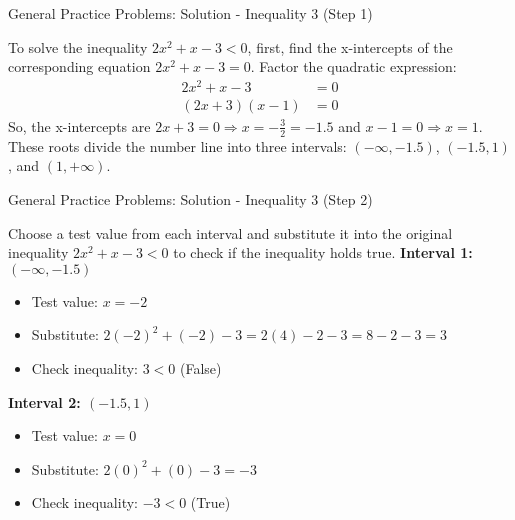 \documentclass[aspectratio=169]{beamer}
\begin{document}
\begin{frame}{General Practice Problems: Solution - Inequality 3 (Step 1)}
    \begin{tcolorbox}[colback=lightgray,colframe=accent,title=Solution: $2x^2 + x - 3 < 0$ (Step 1 - Find X-intercepts)]
        \footnotesize
        To solve the inequality $2x^2 + x - 3 < 0$, first, find the x-intercepts of the corresponding equation $2x^2 + x - 3 = 0$.
        Factor the quadratic expression:
        \begin{align*}
            2x^2 + x - 3 &= 0 \\
            (2x+3)(x-1) &= 0
        \end{align*}
        So, the x-intercepts are $2x+3=0 \Rightarrow x = -\frac{3}{2} = -1.5$ and $x-1=0 \Rightarrow x=1$.
        These roots divide the number line into three intervals: $(-\infty, -1.5)$, $(-1.5, 1)$, and $(1, +\infty)$.
    \end{tcolorbox}
\end{frame}

\begin{frame}{General Practice Problems: Solution - Inequality 3 (Step 2)}
    \begin{tcolorbox}[colback=lightgray,colframe=accent,title=Solution: $2x^2 + x - 3 < 0$ (Step 2 - Use Test Values)]
        \footnotesize
        Choose a test value from each interval and substitute it into the original inequality $2x^2 + x - 3 < 0$ to check if the inequality holds true.
        \newline
        \textbf{Interval 1: $(-\infty, -1.5)$}
        \begin{itemize}
            \item Test value: $x=-2$
            \item Substitute: $2(-2)^2 + (-2) - 3 = 2(4) - 2 - 3 = 8 - 2 - 3 = 3$
            \item Check inequality: $3 < 0$ (False)
        \end{itemize}
        \newline
        \textbf{Interval 2: $(-1.5, 1)$}
        \begin{itemize}
            \item Test value: $x=0$
            \item Substitute: $2(0)^2 + (0) - 3 = -3$
            \item Check inequality: $-3 < 0$ (True)
        \end{itemize}
    \end{tcolorbox}
\end{frame}
\end{document}
